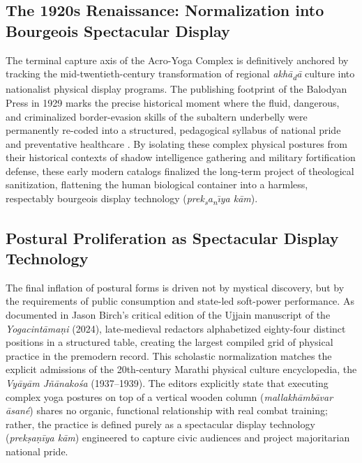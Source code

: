 \documentclass[11pt,twoside,letterpaper]{article}
\begin{document}
\subsection{The 1920s Renaissance: Normalization into Bourgeois Spectacular Display}
The terminal capture axis of the Acro-Yoga Complex is definitively anchored by tracking the mid-twentieth-century transformation of regional \textit{akh\={a}\textsubscript{d}\={a}} culture into nationalist physical display programs. The publishing footprint of the Balodyan Press in 1929 marks the precise historical moment where the fluid, dangerous, and criminalized border-evasion skills of the subaltern underbelly were permanently re-coded into a structured, pedagogical syllabus of national pride and preventative healthcare \cite{Khasgivale1929}. By isolating these complex physical postures from their historical contexts of shadow intelligence gathering and military fortification defense, these early modern catalogs finalized the long-term project of theological sanitization, flattening the human biological container into a harmless, respectably bourgeois display technology (\textit{prek\textsubscript{s}a\textsubscript{n}\={\i}ya k\={a}m}).

\subsection{Postural Proliferation as Spectacular Display Technology}

The final inflation of postural forms is driven not by mystical discovery, but by the requirements of public consumption and state-led soft-power performance. As documented in Jason Birch’s critical edition of the Ujjain manuscript of the \textit{Yogacintāmaṇi} (2024), late-medieval redactors alphabetized eighty-four distinct positions in a structured table, creating the largest compiled grid of physical practice in the premodern record. This scholastic normalization matches the explicit admissions of the 20th-century Marathi physical culture encyclopedia, the \textit{Vyāyām Jñānakośa} (1937--1939). The editors explicitly state that executing complex yoga postures on top of a vertical wooden column (\textit{mallakhāmbāvar āsané}) shares no organic, functional relationship with real combat training; rather, the practice is defined purely as a spectacular display technology (\textit{prekṣaṇīya kām}) engineered to capture civic audiences and project majoritarian national pride.
\end{document}
